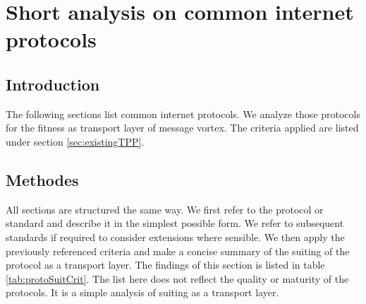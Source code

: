 \documentclass[a4paper,appendixprefix,pdfusetitle,twocolumn,fontsize=8pt,draft,DIV=calc,8pt]{\doctype} %
\begin{document}
\mainmatter







\onecolumn
\appendix
{}%
\renewcommand*{\thepage}{A\arabic{page}}



\gdef\rfc{../../../../rfc/src/xml2rfc/draft-gwerder-messagevortexmain-04.pdf}
%



\twocolumn\clearpage
\chapter{Short analysis on common internet protocols\label{app:transportProtocols}}

\section{Introduction}
The following sections list common internet protocols. We analyze those protocols for the fitness as transport layer of message vortex. The criteria applied are listed under section \ref{sec:existingTPP}.

\section{Methodes}
All sections are structured the same way. We first refer to the protocol or standard and describe it in the simplest possible form. We refer to subsequent standards if required to consider extensions where sensible. We then apply the previously referenced criteria and make a concise summary of the suiting of the protocol as a transport layer. The findings of this section is listed in table \ref{tab:protoSuitCrit}. The list here does not reflect the quality or maturity of the protocols. It is a simple analysis of suiting as a transport layer.
\end{document}

